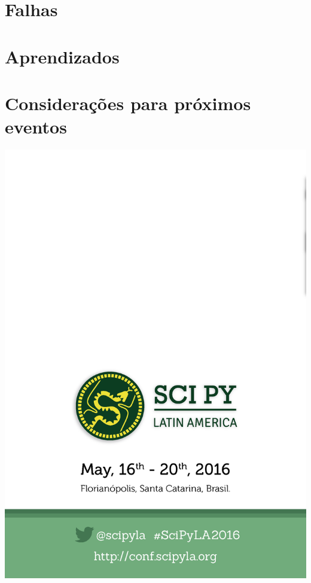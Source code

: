 \documentclass[12pt]{article}
\begin{document}

\newpage

\section*{Falhas}


\newpage

\section*{Aprendizados}

\newpage

\section*{Considerações para próximos eventos}

\clearpage
\newpage

\thispagestyle{empty}
\noindent  %
\includegraphics{../../assets/contra-capa}
\NoBgThispage
\end{document}
